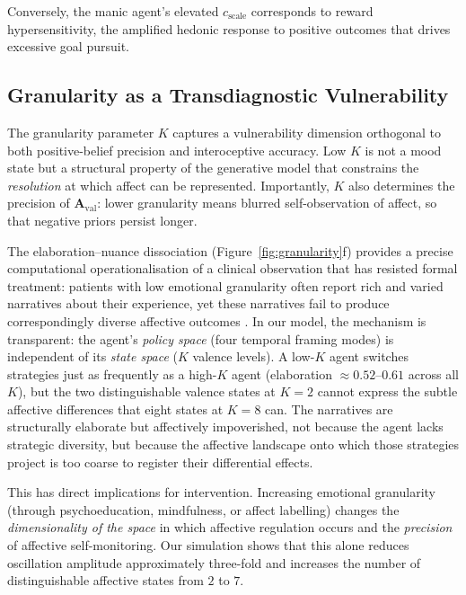 \documentclass[11pt,a4paper]{article}
\begin{document}
Conversely, the manic agent's elevated $c_{\text{scale}}$ corresponds to reward hypersensitivity, the amplified hedonic response to positive outcomes that drives excessive goal pursuit.

\subsection{Granularity as a Transdiagnostic Vulnerability}

The granularity parameter $K$ captures a vulnerability dimension orthogonal to both positive-belief precision and interoceptive accuracy. Low $K$ is not a mood state but a structural property of the generative model that constrains the \emph{resolution} at which affect can be represented. Importantly, $K$ also determines the precision of $\mathbf{A}_{\text{val}}$: lower granularity means blurred self-observation of affect, so that negative priors persist longer.

The elaboration--nuance dissociation (Figure~\ref{fig:granularity}f) provides a precise computational operationalisation of a clinical observation that has resisted formal treatment: patients with low emotional granularity often report rich and varied narratives about their experience, yet these narratives fail to produce correspondingly diverse affective outcomes \citep{barrett2017theory}. In our model, the mechanism is transparent: the agent's \emph{policy space} (four temporal framing modes) is independent of its \emph{state space} ($K$ valence levels). A low-$K$ agent switches strategies just as frequently as a high-$K$ agent (elaboration $\approx 0.52$--$0.61$ across all $K$), but the two distinguishable valence states at $K{=}2$ cannot express the subtle affective differences that eight states at $K{=}8$ can. The narratives are structurally elaborate but affectively impoverished, not because the agent lacks strategic diversity, but because the affective landscape onto which those strategies project is too coarse to register their differential effects.

This has direct implications for intervention. Increasing emotional granularity (through psychoeducation, mindfulness, or affect labelling) changes the \emph{dimensionality of the space} in which affective regulation occurs and the \emph{precision} of affective self-monitoring. Our simulation shows that this alone reduces oscillation amplitude approximately three-fold and increases the number of distinguishable affective states from $2$ to $7$.
\end{document}
